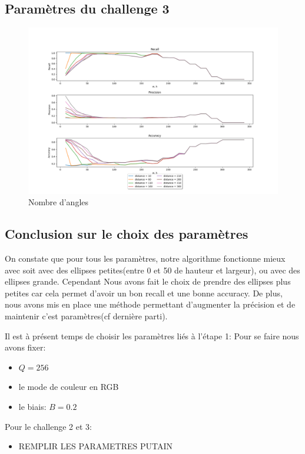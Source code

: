 \documentclass[a4paper,12pt, openany]{book}
\theoremstyle{break}
\begin{document}
\subsection{Paramètres du challenge 3}

\begin{figure}[H]
  \includegraphics[width=\textwidth]{images/compare_distance}
  \caption{Nombre d'angles}
  \label{fig:dist}
\end{figure}

\subsection{Conclusion sur le choix des paramètres}
On constate que pour tous les paramètres, notre algorithme fonctionne mieux avec soit avec des ellipses petites(entre 0 et 50 de hauteur et largeur), ou avec des ellipses grande. Cependant Nous avons fait le choix de prendre des ellipses plus petites car cela permet d'avoir un bon recall et une bonne accuracy. De plus, nous avons mis en place une méthode permettant d'augmenter la précision et de maintenir c'est paramètres(cf dernière parti).

Il est à présent temps de choisir les paramètres liés à l'étape 1: Pour se faire nous avons fixer:

\begin{itemize}
  \item $Q = 256$
  \item le mode de couleur en RGB
  \item le biais: $B = 0.2$
\end{itemize}

Pour le challenge 2 et 3:

\begin{itemize}
  \item REMPLIR LES PARAMETRES PUTAIN
\end{itemize}
\end{document}
